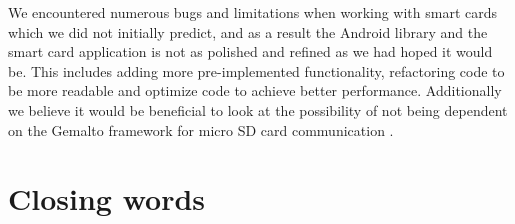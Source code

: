 We encountered numerous bugs and limitations when working with smart cards which we did not initially predict, and as a result the Android library and the smart card application is not as polished and refined as we had hoped it would be. This includes adding more pre-implemented functionality, refactoring code to be more readable and optimize code to achieve better performance. Additionally we believe it would be beneficial to look at the possibility of not being dependent on the Gemalto framework for micro SD card communication \cite[\textit{SEEK for Android}]{SEEK}.


\section{Closing words}
